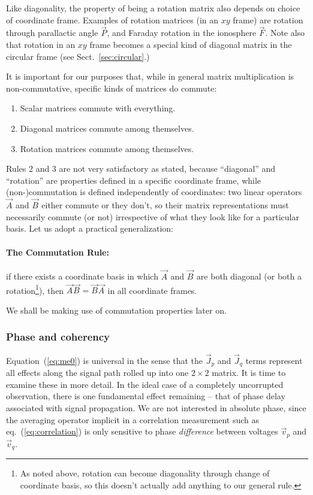 \documentclass[]{aa}
\newcommand{\jones}[2]{\vec {#1}_{#2}}
\begin{document}
Like diagonality, the property of being a rotation matrix also depends on choice of coordinate frame. Examples of rotation matrices (in an $xy$ frame) are rotation through parallactic angle $\jones{P}{}$, and Faraday rotation in the ionosphere $\jones{F}{}$. Note also that rotation in an $xy$ frame becomes a special kind of diagonal matrix in the circular frame (see Sect.~\ref{sec:circular}.)

It is important for our purposes that, while in general matrix multiplication is non-commutative, specific kinds of matrices do commute:

\begin{enumerate}
\item Scalar matrices commute with everything.
\item Diagonal matrices commute among themselves.
\item Rotation matrices commute among themselves.
\end{enumerate}

Rules 2 and 3 are not very satisfactory as stated, because ``diagonal'' and ``rotation'' are properties defined in a specific coordinate frame, while (non-)commutation is defined independently of coordinates: two linear operators $\jones{A}{}$ and $\jones{B}{}$ either commute or they don't, so their matrix representations must necessarily commute (or not) irrespective of what they look like for a particular basis. Let us adopt a practical generalization: 

\paragraph{The Commutation Rule:} if there exists a coordinate basis in which $\jones{A}{}$ and $\jones{B}{}$ are both diagonal (or both a rotation\footnote{As noted above, rotation can become diagonality through change of coordinate basis, so this doesn't actually add anything to our general rule.}), then $\jones{A}{} \jones{B}{}=\jones{B}{}\jones{A}{}$ in all coordinate frames. 

We shall be making use of commutation properties later on.

\subsubsection{\label{sec:coherency}Phase and coherency}

Equation~(\ref{eq:me0}) is universal in the sense that the $\jones{J}{p}$ and $\jones{J}{q}$ terms represent all effects along the signal path rolled up into one $2\times2$ matrix. It is time to examine these in more detail. In the ideal case of a completely uncorrupted observation, there is one fundamental effect remaining -- that of phase delay associated with signal propagation. We are not interested in absolute phase, since the averaging operator implicit in a correlation measurement such as eq.~(\ref{eq:correlation}) is only sensitive to phase {\em difference} between voltages $\vec v_p$ and $\vec v_q$. 
\end{document}
